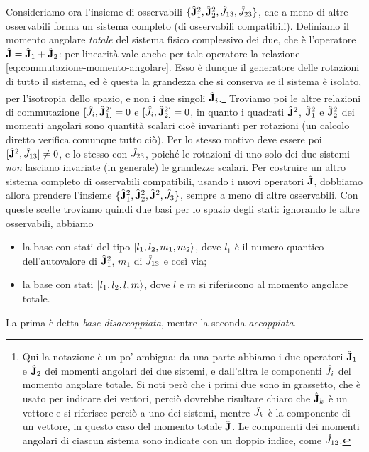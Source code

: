 Consideriamo ora l'insieme di osservabili $\{\hat{\mathbf{J}}_1^2,\hat{\mathbf{J}}_2^2,\hat{J}_{13},\hat{J}_{23}\}$, che a meno di altre osservabili forma un sistema completo (di osservabili compatibili).
Definiamo il momento angolare \emph{totale} del sistema fisico complessivo dei due, che è l'operatore $\hat{\mathbf{J}}=\hat{\mathbf{J}}_1+\hat{\mathbf{J}}_2$: per linearità vale anche per tale operatore la relazione \eqref{eq:commutazione-momento-angolare}.
Esso è dunque il generatore delle rotazioni di tutto il sistema, ed è questa la grandezza che si conserva se il sistema è isolato, per l'isotropia dello spazio, e non i due singoli $\hat{\mathbf{J}}_i$.\footnote{
	Qui la notazione è un po' ambigua: da una parte abbiamo i due operatori $\hat{\mathbf{J}}_1$ e $\hat{\mathbf{J}}_2$ dei momenti angolari dei due sistemi, e dall'altra le componenti $\hat{J}_i$ del momento angolare totale.
	Si noti però che i primi due sono in grassetto, che è usato per indicare dei vettori, perciò dovrebbe risultare chiaro che $\hat{\mathbf{J}}_k$ è un vettore e si riferisce perciò a uno dei sistemi, mentre $\hat{J}_k$ è la componente di un vettore, in questo caso del momento totale $\hat{\mathbf{J}}$.
	Le componenti dei momenti angolari di ciascun sistema sono indicate con un doppio indice, come $\hat{J}_{12}$.
}
Troviamo poi le altre relazioni di commutazione $[\hat{J}_i,\hat{\mathbf{J}}_1^2]=0$ e $[\hat{J}_i,\hat{\mathbf{J}}_2^2]=0$, in quanto i quadrati $\hat{\mathbf{J}}^2$, $\hat{\mathbf{J}}_1^2$ e $\hat{\mathbf{J}}_2^2$ dei momenti angolari sono quantità scalari cioè invarianti per rotazioni (un calcolo diretto verifica comunque tutto ciò).
Per lo stesso motivo deve essere poi $[\hat{\mathbf{J}}^2,\hat{J}_{13}]\ne 0$, e lo stesso con $\hat{J}_{23}$, poich\'e le rotazioni di uno solo dei due sistemi \emph{non} lasciano invariate (in generale) le grandezze scalari.
Per costruire un altro sistema completo di osservabili compatibili, usando i nuovi operatori $\hat{\mathbf{J}}$, dobbiamo allora prendere l'insieme $\{\hat{\mathbf{J}}_1^2,\hat{\mathbf{J}}_2^2,\hat{\mathbf{J}}^2,\hat{J}_3\}$, sempre a meno di altre osservabili.
Con queste scelte troviamo quindi due basi per lo spazio degli stati: ignorando le altre osservabili, abbiamo
\begin{itemize}
	\item la base con stati del tipo $\left|{l_1,l_2,m_1,m_2}\right\rangle$, dove $l_1$ è il numero quantico dell'autovalore di $\hat{\mathbf{J}}_1^2$, $m_1$ di $\hat{J}_{13}$ e cos\`i via;
	\item la base con stati $\left|{l_1,l_2,l,m}\right\rangle$, dove $l$ e $m$ si riferiscono al momento angolare totale.
\end{itemize}
La prima è detta \emph{base disaccoppiata}, mentre la seconda \emph{accoppiata}.
